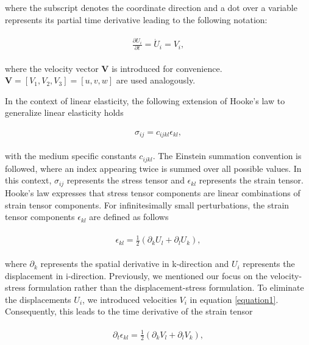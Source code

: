 where the subscript denotes the coordinate direction and a dot over a variable represents its partial time derivative leading to the following notation:

\begin{align}
    \begin{split}
        \frac{\partial U_i}{\partial t} = \dot{U}_i = V_i,
    \end{split}
    \label{equation1}
\end{align}

where the velocity vector $\mathbf{V} $ is introduced for convenience. $\mathbf{V} = [V_1, V_2, V_3] = [u, v ,w]$ are used analogously.

In the context of linear elasticity, the following extension of Hooke's law  to generalize linear elasticity holds

\begin{align}
    \begin{split}
        \sigma_{ij} = c_{ijkl}\epsilon_{kl},
    \end{split}
    \label{eq:hookeslaw}
\end{align}

with the medium specific constants $c_{ijkl}$. The Einstein summation convention
is followed, where an index appearing twice is summed over all possible values. In this context, $\sigma_{ij}$ represents the stress tensor
and $\epsilon_{kl}$ represents the strain tensor. Hooke's law expresses that stress tensor components are linear combinations of strain tensor
components. For infinitesimally small perturbations, the strain tensor components $\epsilon_{kl}$ are defined as follows

\begin{align}
    \begin{split}
        \epsilon_{kl} = \frac{1}{2}\left(\partial_k U_l + \partial_l U_k \right) ,
    \end{split}
\end{align}

where $\partial_k$ represents the spatial derivative in k-direction and $U_i$ represents the displacement in i-direction.
Previously, we mentioned our focus on the velocity-stress formulation rather than the displacement-stress formulation.
To eliminate the displacements $U_i$, we introduced velocities $V_i$ in equation \ref{equation1}.
Consequently, this leads to the time derivative of the strain tensor

\begin{align}
    \begin{split}
        \partial_t \epsilon_{kl} = \frac{1}{2}\left(\partial_k V_l + \partial_l V_k \right) ,
    \end{split}
\end{align}

